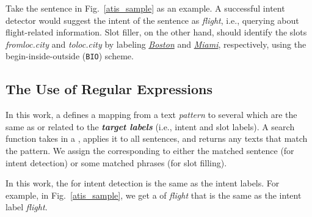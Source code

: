 
Take the sentence in Fig.~\ref{atis_sample} as an example.
A successful intent detector would suggest the intent of the sentence as \emph{flight}, i.e., querying
about flight-related information. Slot filler, on the other hand, should identify the slots \emph{fromloc.city} and
\emph{toloc.city} by labeling \underline{\textit{Boston}} and \underline{\textit{Miami}}, respectively,
using the begin-inside-outside (\texttt{BIO}) scheme.




\subsection{The Use of Regular Expressions}
\label{re_desc} \vspace{-2mm}

In this work, a \RE defines a mapping from a text \emph{pattern} to several \textbf{\emph{\REtags}} which are  the same as or related to
the \textbf{\emph{target labels}} (i.e., intent and slot labels). A search function takes in a \RE, applies it to all sentences, and
returns
any texts that match the pattern. %
We assign the corresponding \REtag to either the matched sentence (for intent detection) or some matched phrases (for slot filling).


In this work, the \REtags for intent detection is the same as the intent labels.
For example,  %
in Fig.~\ref{atis_sample},
we get a \REtag of \emph{flight} that is the same as %
 the intent label \emph{flight}.



